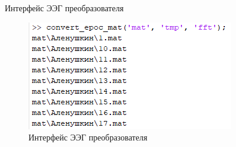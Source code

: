 \begin{frame}{Интерфейс ЭЭГ преобразователя}
	\begin{figure}
        \includegraphics[width=\textwidth]{img/converter_interface.png}
        \caption{Интерфейс ЭЭГ преобразователя}
    \end{figure}
\end{frame}
